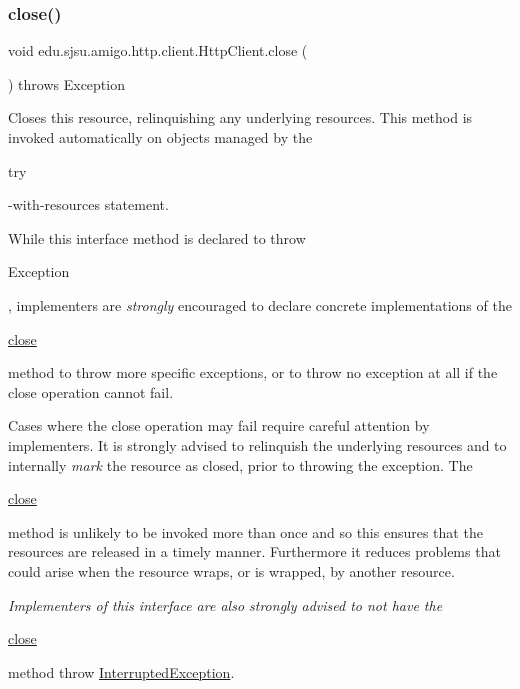 \subsubsection{\texorpdfstring{close()}{close()}}
{\footnotesize\ttfamily void edu.\+sjsu.\+amigo.\+http.\+client.\+Http\+Client.\+close (\begin{DoxyParamCaption}{ }\end{DoxyParamCaption}) throws Exception}

Closes this resource, relinquishing any underlying resources. This method is invoked automatically on objects managed by the 
\begin{DoxyCode}
\textcolor{keywordflow}{try} 
\end{DoxyCode}
 -\/with-\/resources statement. 

While this interface method is declared to throw
\begin{DoxyCode}
Exception 
\end{DoxyCode}
 , implementers are {\itshape strongly} encouraged to declare concrete implementations of the
\begin{DoxyCode}
\hyperlink{classedu_1_1sjsu_1_1amigo_1_1http_1_1client_1_1_http_client_a5807fb0dab40c227bb34ffc14e708294}{close} 
\end{DoxyCode}
 method to throw more specific exceptions, or to throw no exception at all if the close operation cannot fail. 

Cases where the close operation may fail require careful attention by implementers. It is strongly advised to relinquish the underlying resources and to internally {\itshape mark} the resource as closed, prior to throwing the exception. The
\begin{DoxyCode}
\hyperlink{classedu_1_1sjsu_1_1amigo_1_1http_1_1client_1_1_http_client_a5807fb0dab40c227bb34ffc14e708294}{close} 
\end{DoxyCode}
 method is unlikely to be invoked more than once and so this ensures that the resources are released in a timely manner. Furthermore it reduces problems that could arise when the resource wraps, or is wrapped, by another resource. 

{\itshape Implementers of this interface are also strongly advised to not have the
\begin{DoxyCode}
\hyperlink{classedu_1_1sjsu_1_1amigo_1_1http_1_1client_1_1_http_client_a5807fb0dab40c227bb34ffc14e708294}{close} 
\end{DoxyCode}
 method throw \hyperlink{}{Interrupted\+Exception}.} 

